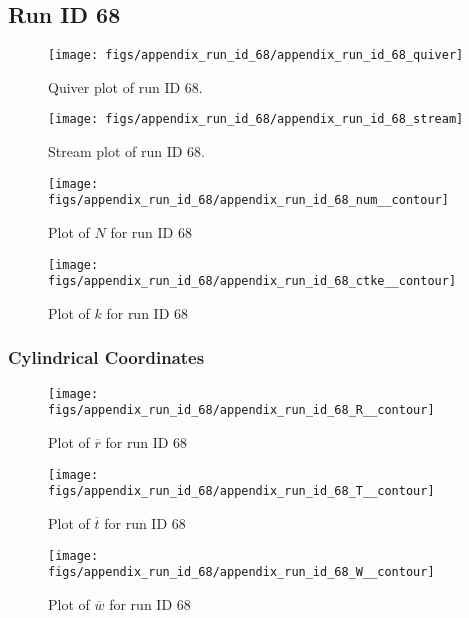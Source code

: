 \subsection{Run ID 68}
\begin{figure}[H]
\centering
\texttt{[image: figs/appendix\_run\_id\_68/appendix\_run\_id\_68\_quiver]}
\caption{Quiver plot of run ID 68.}
\label{fig:appendix_run_id_68_quiver}
\end{figure}


\begin{figure}[H]
\centering
\texttt{[image: figs/appendix\_run\_id\_68/appendix\_run\_id\_68\_stream]}
\caption{Stream plot of run ID 68.}
\label{fig:appendix_run_id_68_stream}
\end{figure}


\begin{figure}[H]
\centering
\texttt{[image: figs/appendix\_run\_id\_68/appendix\_run\_id\_68\_num\_\_contour]}
\caption{Plot of $N$ for run ID 68}
\label{fig:appendix_run_id_68_num__contour}
\end{figure}


\begin{figure}[H]
\centering
\texttt{[image: figs/appendix\_run\_id\_68/appendix\_run\_id\_68\_ctke\_\_contour]}
\caption{Plot of $k$ for run ID 68}
\label{fig:appendix_run_id_68_ctke__contour}
\end{figure}


\subsubsection{Cylindrical Coordinates}
\begin{figure}[H]
\centering
\texttt{[image: figs/appendix\_run\_id\_68/appendix\_run\_id\_68\_R\_\_contour]}
\caption{Plot of $\overline{r}$ for run ID 68}
\label{fig:appendix_run_id_68_R__contour}
\end{figure}


\begin{figure}[H]
\centering
\texttt{[image: figs/appendix\_run\_id\_68/appendix\_run\_id\_68\_T\_\_contour]}
\caption{Plot of $\overline{t}$ for run ID 68}
\label{fig:appendix_run_id_68_T__contour}
\end{figure}


\begin{figure}[H]
\centering
\texttt{[image: figs/appendix\_run\_id\_68/appendix\_run\_id\_68\_W\_\_contour]}
\caption{Plot of $\overline{w}$ for run ID 68}
\label{fig:appendix_run_id_68_W__contour}
\end{figure}


